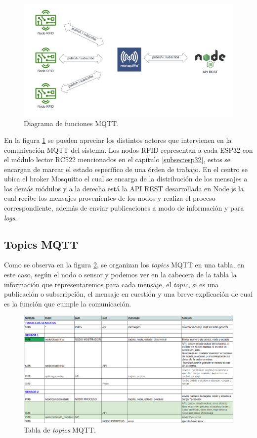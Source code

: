 \begin{figure}[ht]
	\centering
	\includegraphics[scale=.25]{./Figures/mqtt-funciones.png}
	\caption{Diagrama de funciones MQTT.}
	\label{fig:mqttfunciones}
	
\end{figure}

En la figura \ref{fig:mqttfunciones} se pueden apreciar los distintos actores que intervienen en la comunicación MQTT del sistema. Los nodos RFID representan a cada ESP32 con el módulo lector RC522 mencionados en el capítulo \ref{subsec:esp32}, estos se encargan de marcar el estado específico de una órden de trabajo. En el centro se ubica el broker Mosquitto el cual se encarga de la distribución de los mensajes a los demás módulos y a la derecha está la API REST desarrollada en Node.js la cual recibe los mensajes provenientes de los nodos y realiza el proceso correspondiente, además de enviar publicaciones a modo de información y para \textit{logs}.

\subsection{Topics MQTT}
\label{subsec:mqtttopics}

Como se observa en la figura \ref{fig:mqtttopics}, se organizan los \textit{topics} MQTT en una tabla, en este caso, según el nodo o sensor y podemos ver en la cabecera de la tabla la información que representaremos para cada mensaje, el \textit{topic}, si es una publicación o subscripción, el mensaje en cuestión y una breve explicación de cual es la función que cumple la comunicación.

\begin{figure}[ht]
	\centering
	\includegraphics[scale=.30]{./Figures/mqtt-topics.png}
	\caption{Tabla de \textit{topics} MQTT.}
	\label{fig:mqtttopics}
	
\end{figure}

